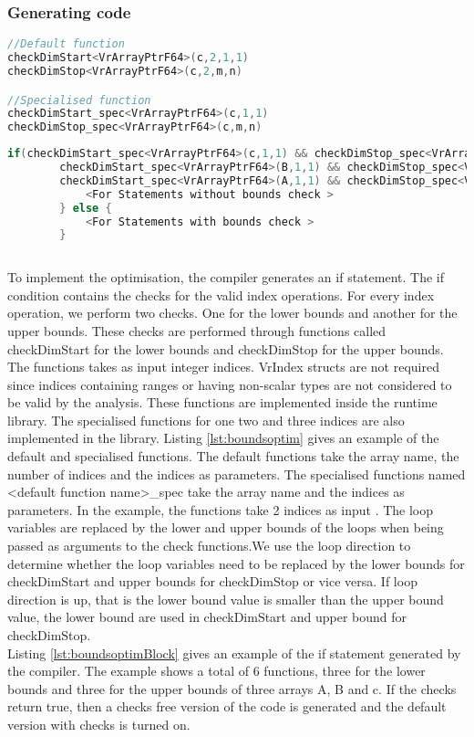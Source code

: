 \subsubsection{Generating code}

\begin{lstlisting}[float,language=c,caption={An example of the default and specialised function calls for the boundscheck optimisations},label={lst:boundsoptim}]
//Default function
checkDimStart<VrArrayPtrF64>(c,2,1,1)
checkDimStop<VrArrayPtrF64>(c,2,m,n)

//Specialised function
checkDimStart_spec<VrArrayPtrF64>(c,1,1)
checkDimStop_spec<VrArrayPtrF64>(c,m,n)
\end{lstlisting}
\begin{lstlisting}[float,language=c,caption={An example of the if statement generated for the boundscheck optimisations},label={lst:boundsoptimBlock}]
 if(checkDimStart_spec<VrArrayPtrF64>(c,1,1) && checkDimStop_spec<VrArrayPtrF64>(c,m,n) && 
		checkDimStart_spec<VrArrayPtrF64>(B,1,1) && checkDimStop_spec<VrArrayPtrF64>(B,k,n) && 
		checkDimStart_spec<VrArrayPtrF64>(A,1,1) && checkDimStop_spec<VrArrayPtrF64>(A,m,k)) {
			<For Statements without bounds check >	
		} else {
			<For Statements with bounds check >	
		}
	
\end{lstlisting}
To implement the optimisation, the compiler generates an if statement. The if condition contains the checks for the valid index operations. For every index operation, we perform two checks. One for the lower bounds and another for the upper bounds. These checks are performed through functions called checkDimStart for the lower bounds and checkDimStop for the upper bounds. The functions takes as input integer indices. VrIndex structs are not required since indices containing ranges or having non-scalar types are not considered to be valid by the analysis. These functions are implemented inside the runtime library. The specialised functions for one two and three indices are also implemented in the library. Listing \ref{lst:boundsoptim} gives an example of the default and specialised functions. The default functions take the array name, the number of indices and the indices as parameters. The specialised functions named <default function name>\_spec take the array name and the indices as parameters. In the example, the functions take 2 indices as input . The loop variables are replaced by the lower and upper bounds of the loops when being passed as arguments to the check functions.We use the loop direction to determine whether the loop variables need to be replaced by the lower bounds for checkDimStart and upper bounds for checkDimStop or vice versa. If loop direction is up, that is the lower bound value is smaller than the upper bound value, the lower bound are used in checkDimStart and upper bound for checkDimStop. \\
Listing \ref{lst:boundsoptimBlock} gives an example of the if statement generated by the compiler. The example shows a total of 6 functions, three for the lower bounds and three for the upper bounds of three arrays A, B and c. If the checks return true, then a checks free version of the code is generated and the default version with checks is turned on. 
